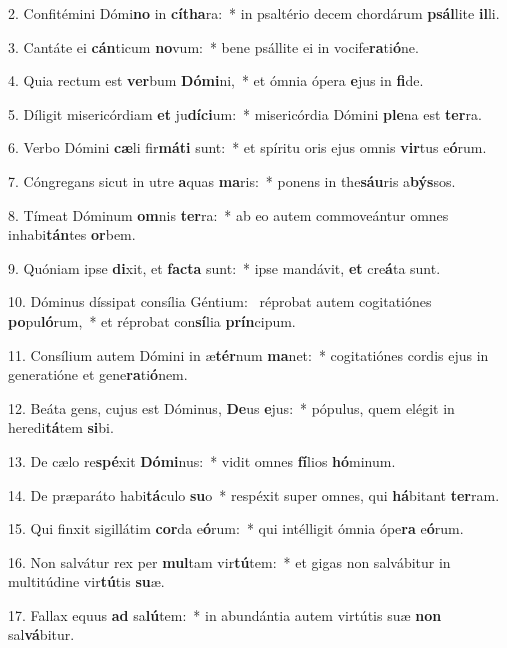 2. Confitémini Dómi\textbf{no} in \textbf{cí}\textbf{tha}ra:~*  in psaltério decem chordárum \textbf{psál}lite \textbf{il}li.\

3. Cantáte ei \textbf{cán}ticum \textbf{no}vum:~*  bene psállite ei in vocife\textbf{ra}ti\textbf{ó}ne.\

4. Quia rectum est \textbf{ver}bum \textbf{Dó}\textbf{mi}ni,~*  et ómnia ópera \textbf{e}jus in \textbf{fi}de.\

5. Díligit misericórdiam \textbf{et} ju\textbf{dí}\textbf{ci}um:~*  misericórdia Dómini \textbf{ple}na est \textbf{ter}ra.\

6. Verbo Dómini \textbf{cæ}li fir\textbf{má}\textbf{ti} sunt:~*  et spíritu oris ejus omnis \textbf{vir}tus e\textbf{ó}rum.\

7. Cóngregans sicut in utre \textbf{a}quas \textbf{ma}ris:~*  ponens in the\textbf{sáu}ris a\textbf{býs}sos.\

8. Tímeat Dóminum \textbf{om}nis \textbf{ter}ra:~*  ab eo autem commoveántur omnes inhabi\textbf{tán}tes \textbf{or}bem.\

9. Quóniam ipse \textbf{di}xit, et \textbf{fac}\textbf{ta} sunt:~*  ipse mandávit, \textbf{et} cre\textbf{á}ta sunt.\

10. Dóminus díssipat consília Géntium: \dag\  réprobat autem cogitatiónes \textbf{po}pu\textbf{ló}rum,~*  et réprobat con\textbf{sí}lia \textbf{prín}cipum.\

11. Consílium autem Dómini in æ\textbf{tér}num \textbf{ma}net:~*  cogitatiónes cordis ejus in generatióne et gene\textbf{ra}ti\textbf{ó}nem.\

12. Beáta gens, cujus est Dóminus, \textbf{De}us \textbf{e}jus:~*  pópulus, quem elégit in heredi\textbf{tá}tem \textbf{si}bi.\

13. De cælo re\textbf{spé}xit \textbf{Dó}\textbf{mi}nus:~*  vidit omnes \textbf{fí}lios \textbf{hó}minum.\

14. De præparáto habi\textbf{tá}culo \textbf{su}o~*  respéxit super omnes, qui \textbf{há}bitant \textbf{ter}ram.\

15. Qui finxit sigillátim \textbf{cor}da e\textbf{ó}rum:~*  qui intélligit ómnia ópe\textbf{ra} e\textbf{ó}rum.\

16. Non salvátur rex per \textbf{mul}tam vir\textbf{tú}tem:~*  et gigas non salvábitur in multitúdine vir\textbf{tú}tis \textbf{su}æ.\

17. Fallax equus \textbf{ad} sa\textbf{lú}tem:~*  in abundántia autem virtútis suæ \textbf{non} sal\textbf{vá}bitur.\

